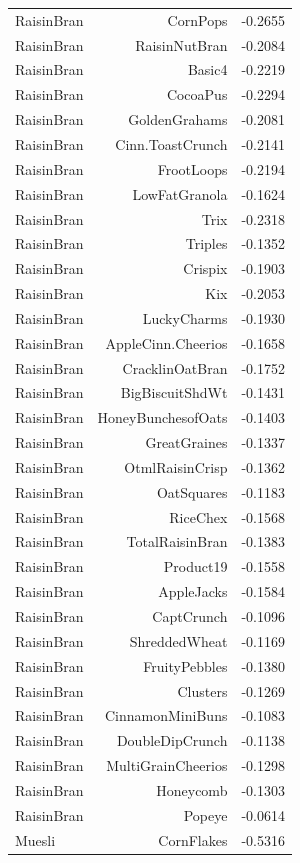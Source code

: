 \begin{longtable}{@{}lrr@{}}
RaisinBran & CornPops & -0.2655 \\
RaisinBran & RaisinNutBran & -0.2084 \\
RaisinBran & Basic4 & -0.2219 \\
RaisinBran & CocoaPus & -0.2294 \\
RaisinBran & GoldenGrahams & -0.2081 \\
RaisinBran & Cinn.ToastCrunch & -0.2141 \\
RaisinBran & FrootLoops & -0.2194 \\
RaisinBran & LowFatGranola & -0.1624 \\
RaisinBran & Trix & -0.2318 \\
RaisinBran & Triples & -0.1352 \\
RaisinBran & Crispix & -0.1903 \\
RaisinBran & Kix & -0.2053 \\
RaisinBran & LuckyCharms & -0.1930 \\
RaisinBran & AppleCinn.Cheerios & -0.1658 \\
RaisinBran & CracklinOatBran & -0.1752 \\
RaisinBran & BigBiscuitShdWt & -0.1431 \\
RaisinBran & HoneyBunchesofOats & -0.1403 \\
RaisinBran & GreatGraines & -0.1337 \\
RaisinBran & OtmlRaisinCrisp & -0.1362 \\
RaisinBran & OatSquares & -0.1183 \\
RaisinBran & RiceChex & -0.1568 \\
RaisinBran & TotalRaisinBran & -0.1383 \\
RaisinBran & Product19 & -0.1558 \\
RaisinBran & AppleJacks & -0.1584 \\
RaisinBran & CaptCrunch & -0.1096 \\
RaisinBran & ShreddedWheat & -0.1169 \\
RaisinBran & FruityPebbles & -0.1380 \\
RaisinBran & Clusters & -0.1269 \\
RaisinBran & CinnamonMiniBuns & -0.1083 \\
RaisinBran & DoubleDipCrunch & -0.1138 \\
RaisinBran & MultiGrainCheerios & -0.1298 \\
RaisinBran & Honeycomb & -0.1303 \\
RaisinBran & Popeye & -0.0614 \\
Muesli & CornFlakes & -0.5316 \\

\end{longtable}
